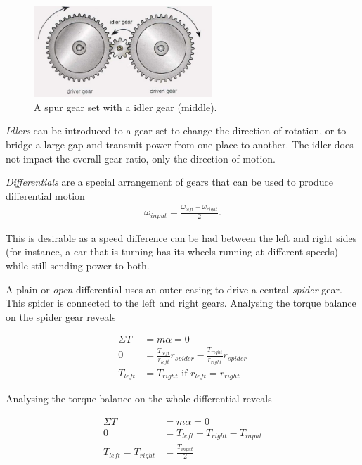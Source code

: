 \begin{figure}[H]
	\includegraphics[width=0.6\textwidth]{imgs/gearset_idler.jpeg}
	\caption{A spur gear set with a idler gear (middle).}
\end{figure}

\textit{Idlers} can be introduced to a gear set to change the direction of rotation, or to bridge a large gap and transmit power from one place to another. The idler does not impact the overall gear ratio, only the direction of motion.

\textit{Differentials} are a special arrangement of gears that can be used to produce differential motion
\begin{align}
	\omega_{input} = \frac{\omega_{left} + \omega_{right}}{2} .
\end{align}

This is desirable as a speed difference can be had between the left and right sides (for instance, a car that is turning has its wheels running at different speeds) while still sending power to both.


A plain or \textit{open} differential uses an outer casing to drive a central \textit{spider} gear. This spider is connected to the left and right gears. Analysing the torque balance on the spider gear reveals

\begin{align}
	\Sigma T &= m \alpha = 0 \nonumber \\
	0 &= \frac{T_{left}}{r_{left}} r_{spider} - \frac{T_{right}}{r_{right}} r_{spider}  \nonumber \\
	T_{left} &= T_{right} \text{ if } r_{left} = r_{right}
\end{align}

Analysing the torque balance on the whole differential reveals

\begin{align}
	\Sigma T &= m \alpha = 0 \nonumber \\
	0 &= T_{left} + T_{right} - T_{input} \nonumber \\
	T_{left} = T_{right} &= \frac{T_{input}}{2}
\end{align}

